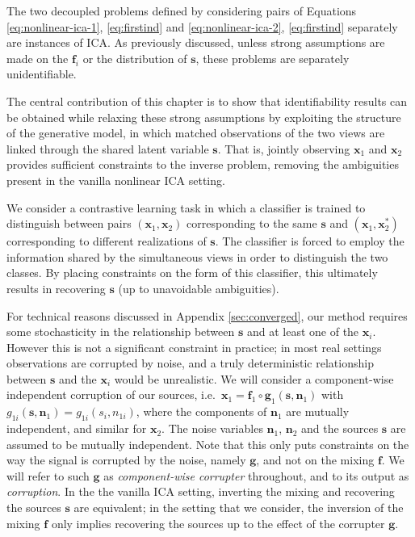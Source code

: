 The two decoupled problems defined by considering pairs of Equations \ref{eq:nonlinear-ica-1}, \ref{eq:firstind} and \ref{eq:nonlinear-ica-2}, \ref{eq:firstind} separately are instances of ICA.
As previously discussed, unless strong assumptions are made on the $\bm{f}_i$ or the distribution of $\bm{s}$, these problems are separately unidentifiable. 

The central contribution of this chapter is to show that identifiability results can be obtained while relaxing these strong assumptions by exploiting the structure of the generative model, in which matched observations of the two views are linked through the shared latent variable $\bm{s}$. 
That is, jointly observing $\bm{x}_1$ and $\bm{x}_2$ provides sufficient constraints to the inverse problem, removing the ambiguities present in the vanilla nonlinear ICA setting.

We consider a contrastive learning task in which a classifier is trained to distinguish between pairs $(\bm{x}_1, \bm{x}_2)$ corresponding to the same $\bm{s}$ and $(\bm{x}_1, \bm{x}^*_2)$ corresponding to different realizations of $\bm{s}$.
The classifier is forced to employ the information shared by the simultaneous views in order to distinguish the two classes.
By placing constraints on the form of this classifier, this ultimately results in recovering $\bm{s}$ (up to unavoidable ambiguities).

For technical reasons discussed in Appendix
\ref{sec:converged}, our method requires some stochasticity in the relationship between $\bm{s}$ and at least one of the $\bm{x}_i$.
However this is not a significant constraint in practice; in most real settings observations are corrupted by noise, and a truly deterministic relationship between $\bm{s}$ and the $\bm{x}_i$ would be unrealistic.
We will consider a component-wise independent corruption of our sources, i.e.~$\bm{x}_1 = \bm{f}_1 \circ \bm{g}_1(\bm{s}, \bm{n}_1)$ with $g_{1i}(\bm{s}, \bm{n}_1) = g_{1i}(s_i, n_{1i})$, where the components of $\bm{n}_{1}$ are mutually independent, and similar for $\bm{x}_2$. The noise variables $\bm{n}_1$, $\bm{n}_2$ and the sources $\bm{s}$ are assumed to be mutually independent.
Note that this only puts constraints on the way the signal is corrupted by the noise, namely $\bm{g}$, and not on the mixing $\bm{f}$.
We will refer to such $\bm{g}$ as \emph{component-wise corrupter} throughout, and to its output as \emph{corruption}.
In the the vanilla ICA setting, inverting the mixing and recovering the sources $\bm{s}$ are equivalent; in the setting that we consider, the inversion of the mixing $\bm{f}$ only implies recovering the sources up to the effect of the corrupter $\bm{g}$.

